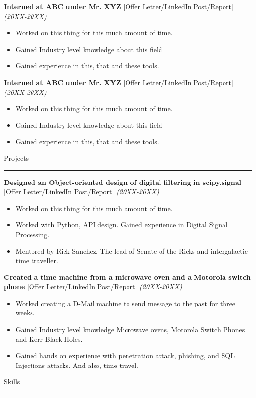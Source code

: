 \documentclass[10pt, hidelinks]{article}
\begin{document}
	{\normalsize\textbf{Interned at ABC under Mr. XYZ}} {\small[\href{https://httpbin.com}{Offer Letter/LinkedIn Post/Report}]} \hspace*{8pt} {\normalsize\textit{(20XX-20XX)}}
	{\vspace*{-3mm}
	\begin{itemize}
		\itemsep-0.3em
		\item Worked on this thing for this much amount of time.
		\item Gained Industry level knowledge about this field
		\item Gained experience in this, that and these tools.
	\end{itemize}
	}
	{\normalsize\textbf{Interned at ABC under Mr. XYZ}} {\small[\href{https://httpbin.com}{Offer Letter/LinkedIn Post/Report}]} \hspace*{8pt} {\normalsize\textit{(20XX-20XX)}}
	{\vspace*{-3mm}
	\begin{itemize}
		\itemsep-0.3em
		\item Worked on this thing for this much amount of time.
		\item Gained Industry level knowledge about this field
		\item Gained experience in this, that and these tools.
	\end{itemize}
	}


	{\large\color{RoyalBlue}Projects}
	\par\noindent\rule[7pt]{\textwidth}{0.1pt}

	{\normalsize\textbf{Designed an Object-oriented design of digital filtering in scipy.signal}} {\small[\href{https://httpbin.com}{Offer Letter/LinkedIn Post/Report}]} \hspace*{8pt} {\normalsize\textit{(20XX-20XX)}}
	{\vspace*{-3mm}
	\begin{itemize}
		\itemsep-0.3em
		\item Worked on this thing for this much amount of time.
		\item Worked with Python, API design. Gained experience in Digital Signal Processing.
		\item Mentored by Rick Sanchez. The lead of Senate of the Ricks and intergalactic time traveller.
	\end{itemize}
	}
	{\normalsize\textbf{Created a time machine from a microwave oven and a Motorola switch phone}} {\small[\href{https://httpbin.com}{Offer Letter/LinkedIn Post/Report}]} \hspace*{8pt} {\normalsize\textit{(20XX-20XX)}}
	{\vspace*{-3mm}
	\begin{itemize}
		\itemsep-0.3em
		\item Worked creating a D-Mail machine to send message to the past for three weeks.
		\item Gained Industry level knowledge Microwave ovens, Motorola Switch Phones and Kerr Black Holes.
		\item Gained hands on experience with penetration attack, phishing, and SQL Injections attacks. And also, time travel.
	\end{itemize}
	}

	{\large\color{RoyalBlue}Skills}
	\par\noindent\rule[7pt]{\textwidth}{0.1pt}
\end{document}
